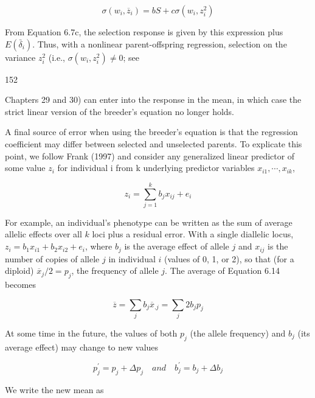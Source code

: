 \documentclass{article}
\begin{document}
\begin{equation}
\sigma(w_{i},\overline{z}_{i})=b S+c\sigma\left(w_{i},z_{i}^{2}\right)
\tag{6.13c}
\label{eq:6_13c}
\end{equation}

From Equation 6.7c, the selection response is given by this expression plus  $ E(\bar{\delta}_i) $. Thus, with a nonlinear parent-offspring regression, selection on the variance  $ z_i^2 $ (i.e.,  $ \sigma(w_i, z_i^2) \neq 0 $; see

152

Chapters 29 and 30) can enter into the response in the mean, in which case the strict linear version of the breeder’s equation no longer holds.

A final source of error when using the breeder’s equation is that the regression coefficient may differ between selected and unselected parents. To explicate this point, we follow Frank (1997) and consider any generalized linear predictor of some value  $ z_i $ for individual i from k underlying predictor variables  $ x_{i1}, \cdots, x_{ik} $,

\begin{equation}
z_{i}=\sum_{j=1}^{k}b_{j}x_{ij}+e_{i}
\tag{6.14}
\label{eq:6_14}
\end{equation}

For example, an individual’s phenotype can be written as the sum of average allelic effects over all  $ k $ loci plus a residual error. With a single diallelic locus,  $ z_i = b_1 x_{i1} + b_2 x_{i2} + e_i $, where  $ b_j $ is the average effect of allele  $ j $ and  $ x_{ij} $ is the number of copies of allele  $ j $ in individual  $ i $ (values of 0, 1, or 2), so that (for a diploid)  $ \overline{x}_j / 2 = p_j $, the frequency of allele  $ j $. The average of Equation 6.14 becomes

\begin{equation}
\overline{z}=\sum_{j}b_{j}\overline{x}_{.j}=\sum_{j}2b_{j}p_{j}
\tag{6.15a}
\label{eq:6_15a}
\end{equation}

At some time in the future, the values of both  $ p_{j} $ (the allele frequency) and  $ b_{j} $ (its average effect) may change to new values

\begin{equation}
p_{j}^{\prime}=p_{j}+\Delta p_{j}\quad and\quad b_{j}^{\prime}=b_{j}+\Delta b_{j}
\tag{6.15b}
\label{eq:6_15b}
\end{equation}

We write the new mean as
\end{document}
